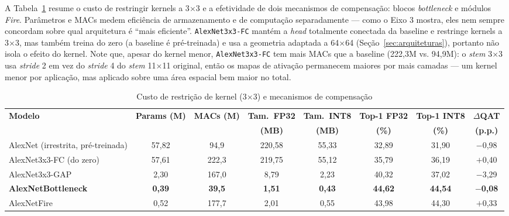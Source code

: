 \documentclass[conference]{IEEEtran}
\begin{document}
A Tabela~\ref{tab:kernel_restriction_cost} resume o custo de restringir kernels a 3$\times$3
e a efetividade de dois mecanismos de compensação: blocos \textit{bottleneck} e módulos
\textit{Fire}. Parâmetros e MACs medem eficiência de armazenamento e de computação separadamente —
como o Eixo 3 mostra, eles nem sempre concordam sobre qual arquitetura é ``mais eficiente''.
\texttt{AlexNet3x3-FC} mantém a \textit{head} totalmente conectada da baseline e restringe kernels a
3$\times$3, mas também treina do zero (a baseline é pré-treinada) e usa a geometria adaptada a
64$\times$64 (Seção~\ref{sec:arquiteturas}), portanto não isola o efeito do kernel. Note que, apesar do kernel menor,
\texttt{AlexNet3x3-FC} tem mais MACs que a baseline (222,3M vs. 94,9M): o \textit{stem} 3$\times$3
usa \textit{stride} 2 em vez do \textit{stride} 4 do \textit{stem} 11$\times$11 original, então os
mapas de ativação permanecem maiores por mais camadas — um kernel menor por aplicação, mas
aplicado sobre uma área espacial bem maior no total.

\begin{table}[!t]
\caption{Custo de restrição de kernel (3$\times$3) e mecanismos de compensação}
\label{tab:kernel_restriction_cost}
\centering
\small
\begin{tabular}{@{}lccccccc@{}}
\toprule
\textbf{Modelo} & \textbf{Params (M)} & \textbf{MACs (M)} & \textbf{Tam.\ FP32} & \textbf{Tam.\ INT8} & \textbf{Top-1 FP32} & \textbf{Top-1 INT8} & \textbf{$\Delta$QAT} \\
& & & \textbf{(MB)} & \textbf{(MB)} & \textbf{(\%)} & \textbf{(\%)} & \textbf{(p.p.)} \\
\midrule
AlexNet (irrestrita, pré-treinada) & 57,82 & 94,9 & 220,58 & 55,33 & 32,89 & 31,90 & $-$0,98 \\
AlexNet3x3-FC (do zero) & 57,61 & 222,3 & 219,75 & 55,12 & 35,79 & 36,19 & $+$0,40 \\
AlexNet3x3-GAP & 2,30  & 167,0 & 8,79 & 2,23 & 40,32 & 37,02 & $-$3,29 \\
\textbf{AlexNetBottleneck} & \textbf{0,39} & \textbf{39,5} & \textbf{1,51} & \textbf{0,43} & \textbf{44,62} & \textbf{44,54} & \textbf{$-$0,08} \\
AlexNetFire & 0,52 & 177,7 & 2,01 & 0,55 & 43,98 & 44,30 & $+$0,33 \\
\bottomrule
\end{tabular}
\end{table}
\end{document}
